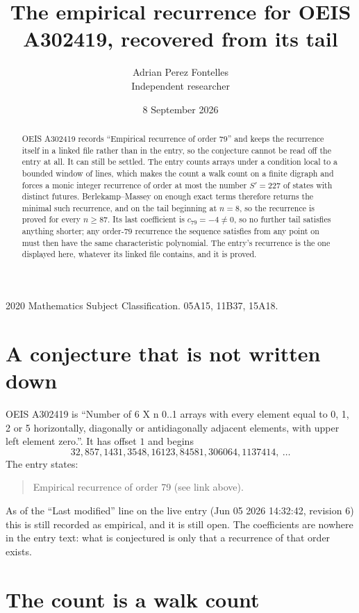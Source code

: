 \documentclass[11pt,a4paper]{article}
\title{The empirical recurrence for OEIS A302419, recovered from its tail}
\author{Adrian Perez Fontelles\\ \small Independent researcher}
\date{8 September 2026}
\theoremstyle{plain}
\theoremstyle{definition}
\begin{document}
\maketitle

\begin{abstract}
OEIS A302419 records ``Empirical recurrence of order $79$'' and keeps the recurrence itself in
a linked file rather than in the entry, so the conjecture cannot be read off the entry at all.
It can still be settled. The entry counts arrays under a condition local to a bounded window of
lines, which makes the count a walk count on a finite digraph and forces a monic integer
recurrence of order at most the number $S'=227$ of states with distinct futures. Berlekamp--Massey on
enough exact terms therefore returns the minimal such recurrence, and on the tail beginning at $n=8$, so the recurrence is proved for every $n\ge87$.
Its last coefficient is $c_{79}=-4\neq0$, so no further tail satisfies anything
shorter; any order-$79$ recurrence the sequence satisfies from any point on must then have
the same characteristic polynomial. The entry's recurrence is the one displayed here, whatever
its linked file contains, and it is proved.
\end{abstract}

\noindent\small 2020 Mathematics Subject Classification. 05A15, 11B37, 15A18.\normalsize

\section{A conjecture that is not written down}

OEIS A302419 is ``Number of 6 X n 0..1 arrays with every element equal to 0, 1, 2 or 5 horizontally, diagonally or antidiagonally adjacent elements, with upper left element zero.''. It has offset $1$ and begins
\[
32, 857, 1431, 3548, 16123, 84581, 306064, 1137414,\ \dots
\]
The entry states:
\begin{quote}
Empirical recurrence of order 79 (see link above).
\end{quote}
As of the ``Last modified'' line on the live entry (Jun 05 2026 14:32:42, revision 6)
this is still recorded as empirical, and it is still open. The coefficients are nowhere in the
entry text: what is conjectured is only that a recurrence of that order exists.

\section{The count is a walk count}
\end{document}
